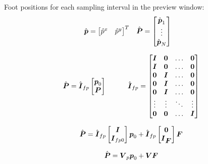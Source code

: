 \documentclass[12pt,a4paper]{article}
\begin{document}
Foot positions for each sampling interval in the preview window:
\begin{align*}
\fph = \begin{bmatrix} \hat{p}^x & \hat{p}^y \end{bmatrix}^T
\quad &
\FPh = \begin{bmatrix} \fph_1 \\ \vdots \\ \fph_N \end{bmatrix}
\end{align*}


\begin{equation*}
    \FPh = \hat{\M{I}}_{fp} 
    \begin{bmatrix}
        \fp_0\\
        \FP\\
    \end{bmatrix}
    \quad\quad\quad
    \hat{\M{I}}_{fp} =
    \begin{bmatrix}
        \M{I}   &   \M{0}   &   \dots   &   \M{0} \\
        \M{I}   &   \M{0}   &   \dots   &   \M{0} \\
        \M{0}   &   \M{I}   &   \dots   &   \M{0} \\
        \M{0}   &   \M{I}   &   \dots   &   \M{0} \\
        \M{0}   &   \M{I}   &   \dots   &   \M{0} \\
        \vdots  &   \vdots  &   \ddots  &   \vdots \\
        \M{0}   &   \M{0}   &   \dots   &   \M{I} \\
    \end{bmatrix}
\end{equation*}


\begin{equation*}
    \FPh = 
    \hat{\M{I}}_{fp}
    \begin{bmatrix}
        \M{I} \\
        \M{I}_{fp0}\\
    \end{bmatrix} 
    \fp_0 
    + 
    \hat{\M{I}}_{fp}
    \begin{bmatrix}
        \M{0} \\
        \M{I}_{\FD} \\
    \end{bmatrix} 
    \FD
\end{equation*}

\begin{equation*}
    \FPh = 
    \M{V}_p
    \fp_0 
    + 
    \M{V}
    \FD
\end{equation*}
\end{document}
